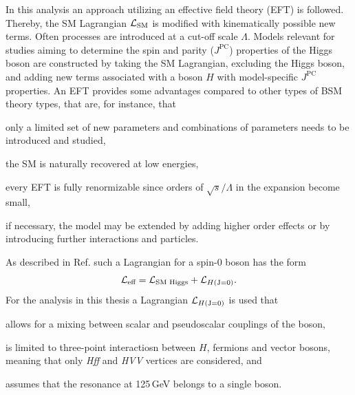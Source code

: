In this analysis an approach utilizing an effective field theory (EFT) is followed. Thereby, the SM Lagrangian $\mathcal{L}_\text{SM}$ 
is modified with kinematically possible new terms. Often processes are introduced at a cut-off scale $\Lambda$. Models relevant for studies aiming to determine the 
spin and parity ($J^\text{PC}$) properties of the Higgs boson are constructed by taking the SM Lagrangian, excluding the Higgs boson, and adding new terms associated with a boson $H$ with model-specific $J^\text{PC}$ properties. 
An EFT provides some advantages compared to other types of BSM theory types, that are, for instance, that
\begin{ct_version_list}
    \item only a limited set of new parameters and combinations of parameters needs to be introduced and studied,
    \item the SM is naturally recovered at low energies,
    \item every EFT is fully renormizable since orders of $\sqrt{s}/\Lambda$ in the expansion become small,
    \item if necessary, the model may be extended by adding  higher order effects or by introducing further interactions and particles.
\end{ct_version_list}
As described in Ref. \cite{Artoisenet2013} such a Lagrangian for a 
spin-0 boson has the form
\begin{equation}
    \mathcal{L}_{\text{eff}} = \mathcal{L}_{\text{SM Higgs}} + \mathcal{L}_{H\text{(J=0)}}. 
\end{equation}%
For the analysis in this thesis a Lagrangian $\mathcal{L}_{H\text{(J=0)}}$ is used that 
\begin{ct_version_list}
    \item allows for a mixing between scalar and pseudoscalar couplings of the boson,
    \item is limited to three-point interactiosn between $H$, fermions and vector bosons, meaning that only \textit{Hff} and \textit{HVV} vertices are considered, and
    \item assumes that the resonance at 125\,{GeV} belongs to a single boson. 
\end{ct_version_list} 

